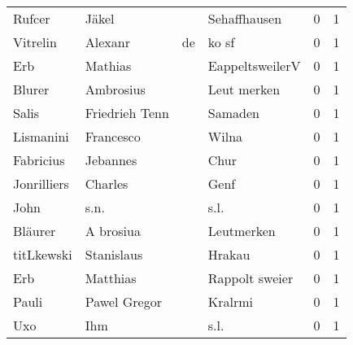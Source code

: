 \documentclass[10pt,a4paper,landscape]{article}
\begin{document}
\begin{longtable}{llllrr}
                   Rufcer &                              Jäkel &             &                                Sehaffhausen &          0 &         1 \\
                 Vitrelin &                            Alexanr &          de &                                       ko sf &          0 &         1 \\
                      Erb &                            Mathias &             &                             EappeltsweilerV &          0 &         1 \\
                   Blurer &                          Ambrosius &             &                                 Leut merken &          0 &         1 \\
                    Salis &                     Friedrieh Tenn &             &                                     Samaden &          0 &         1 \\
                Lismanini &                          Francesco &             &                                       Wilna &          0 &         1 \\
                Fabricius &                           Jebannes &             &                                        Chur &          0 &         1 \\
              Jonrilliers &                            Charles &             &                                        Genf &          0 &         1 \\
                     John &                               s.n. &             &                                        s.l. &          0 &         1 \\
                  Bläurer &                          A brosiua &             &                                  Leutmerken &          0 &         1 \\
               titLkewski &                         Stanislaus &             &                                      Hrakau &          0 &         1 \\
                      Erb &                           Matthias &             &                              Rappolt sweier &          0 &         1 \\
                    Pauli &                       Pawel Gregor &             &                                     Kralrmi &          0 &         1 \\
                      Uxo &                                Ihm &             &                                        s.l. &          0 &         1 \\

\end{longtable}
\end{document}
